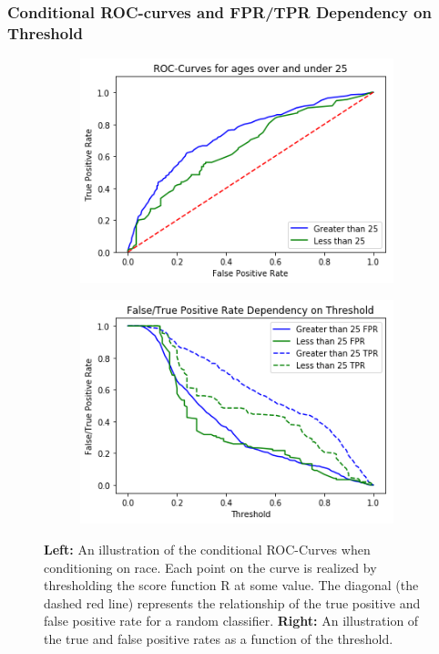 \documentclass[11pt, fleqn, titlepage]{article}
\begin{document}
	
	\subsubsection{Conditional ROC-curves and FPR/TPR Dependency on Threshold}
	
	\begin{figure}[H]
		\centering
		\begin{subfigure}{0.5\textwidth}
			\centering
			\includegraphics[width=0.9\linewidth]{imgs/ROC_age.png}
		\end{subfigure}%
		\begin{subfigure}{0.5\textwidth}
			\centering
			\includegraphics[width=0.9\linewidth]{imgs/fpr_tpr_plot_age.png}
		\end{subfigure}
		\caption{\textbf{Left:} An illustration of the conditional ROC-Curves when conditioning on race. Each point on the curve is realized by thresholding the score function R at some value. The diagonal (the dashed red line) represents the relationship of the true positive and false positive rate for a random classifier. \textbf{Right:} An illustration of the true and false positive rates as a function of the threshold.}
		\label{fig:roc-curve}
	\end{figure}
	
\end{document}

